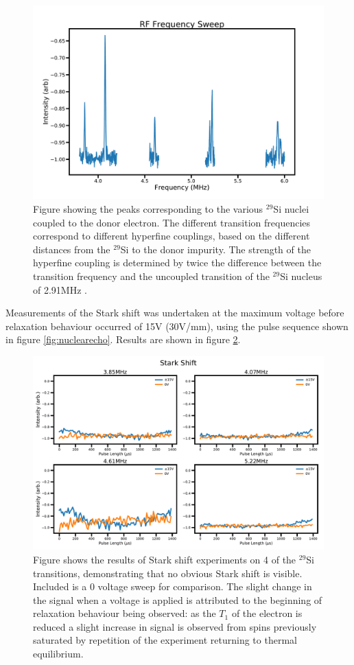 \begin{figure}
\centering
\includegraphics[width = 0.8\columnwidth]{Figures/FreqSweep.pdf} 
\caption[Frequency sweep of $^{29}$Si transitions]{Figure showing the peaks corresponding to the various $^{29}$Si nuclei coupled to the donor electron. The different transition frequencies correspond to different hyperfine couplings, based on the different distances from the $^{29}$Si to the donor impurity. The strength of the hyperfine coupling is determined by twice the difference between the transition frequency and the uncoupled transition of the $^{29}$Si nucleus of 2.91MHz \cite{Wolfowicz2016a}.}
\label{fig:si29freqsweep}
\end{figure}

Measurements of the Stark shift was undertaken at the maximum voltage before relaxation behaviour occurred of 15V (30V/mm), using the pulse sequence shown in figure \ref{fig:nuclearecho}.
Results are shown in figure \ref{fig:si29NoStark}.


\begin{figure}
\centering
\includegraphics[width=\columnwidth]{Figures/StarkShiftMultiEchoReb.pdf}
\caption[Stark shift measurements of $^{29}$Si]{Figure shows the results of Stark shift experiments on 4 of the $^{29}$Si transitions, demonstrating that no obvious Stark shift is visible. Included is a 0 voltage sweep for comparison. The slight change in the signal when a voltage is applied is attributed to the beginning of relaxation behaviour being observed: as the $T_1$ of the electron is reduced a slight increase in signal is observed from spins previously saturated by repetition of the experiment returning to thermal equilibrium.} 
\label{fig:si29NoStark}
\end{figure}

